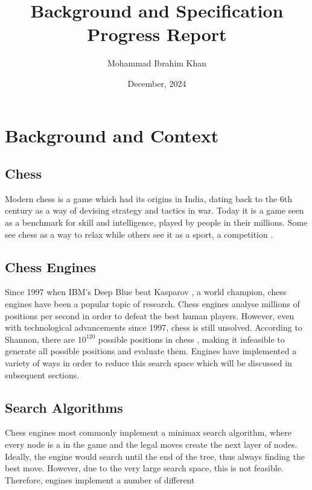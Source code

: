 \documentclass{article}
\title{Background and Specification Progress Report}
\author{Mohammad Ibrahim Khan}
\date{December, 2024}
\begin{document}
\maketitle

\tableofcontents
\listoffigures
\listoftables

\section{Background and Context}
\label{sec:background}

\subsection{Chess}
\label{sec:chess}
Modern chess is a game which had its origins in India, dating back to the 6th century \cite{davidsonShortHistoryChess2012}
as a way of devising strategy and tactics in war. Today it is a game seen as a benchmark for skill and 
intelligence, played by people in their millions. Some see chess as a way to relax while others 
see it as a sport, a competition \cite{averbakhHistoryChessChaturanga2012}.

\subsection{Chess Engines}
\label{sec:engines}
Since 1997 when IBM's Deep Blue beat Kasparov \cite{hsuIBMsDeepBlue1999}, a world champion, chess engines have been a 
popular topic of research. Chess engines analyse millions of positions per second in order to defeat
the best human players. However, even with technological advancements since 1997, chess is still
unsolved. According to Shannon, there are $10^{120}$ possible positions in chess \cite{shannonXXIIProgrammingComputer1950},
making it infeasible to generate all possible positions and evaluate them. Engines have
implemented a variety of ways in order to reduce this search space which will be discussed in subsequent
sections.

\subsection{Search Algorithms}
\label{sec:search}
Chess engines most commonly implement a minimax search algorithm, where every node is a 
in the game and the legal moves create the next layer of nodes. Ideally, the engine would search
until the end of the tree, thus always finding the best move. However, due to the very large search space,
this is not feasible. Therefore, engines implement a number of different
\end{document}
